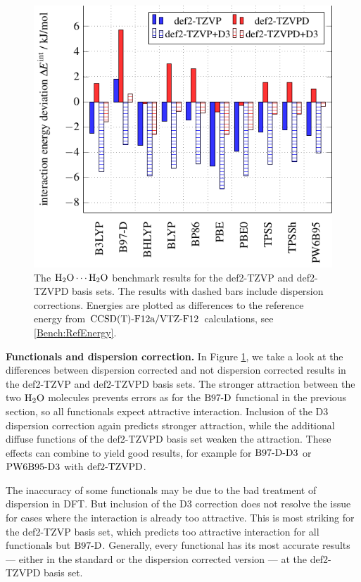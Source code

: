 \begin{figure}[b!]
\includegraphics[width=.7\textwidth]{TikzPics/TikzCreation/Bench/BenchH2O+H2O.TZVPCompare.pdf}
\caption{The $\mbox{\ensuremath{\text H _2 \text O \cdots \text H _2 \text O}}$ benchmark results for the def2-TZVP and def2-TZVPD basis sets.
The results with dashed bars include dispersion corrections. Energies are plotted as differences
to the reference energy from $\text{CCSD(T)-F12a}/\text{VTZ-F}12$ calculations, see \eqref{Bench:RefEnergy}.}
\label{Fig:Bench:H2O+H2O:TZVPCompare}
\end{figure}

\textbf{Functionals and dispersion correction.} In Figure
\ref{Fig:Bench:H2O+H2O:TZVPCompare}, we take a look at the differences between dispersion corrected and not dispersion
corrected results in the def2-TZVP and def2-TZVPD basis sets. The stronger
attraction between the two $\text H _2 \text O$ molecules prevents errors as for the
$\text{B97-D}$ functional in the previous section, so all functionals expect attractive
interaction. Inclusion of the D3 dispersion correction again predicts
stronger attraction, while the additional diffuse functions of the def2-TZVPD
basis set weaken the attraction. These effects can combine to yield good
results, for example for $\text{B97-D}\text{-D3}$ or $\text{PW6B95}\text{-D3}$ with $\text{def2-TZVPD}$.

The inaccuracy of some functionals may be due to the bad treatment of
dispersion in DFT. But inclusion of the D3 correction does not resolve the issue for cases
where the interaction is already too attractive. This
is most striking for the def2-TZVP basis set, which predicts too attractive
interaction for all functionals but $\text{B97-D}$. Generally, every functional has its
most accurate results --- either in the standard or the dispersion corrected
version --- at the def2-TZVPD basis set.
 
